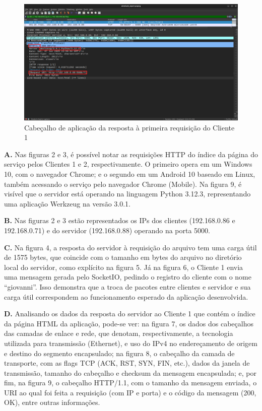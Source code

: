 \documentclass[conference,compsoc]{IEEEtran}
\begin{document}
\begin{otherlanguage}{brazil}
\begin{figure}[!h]
\centering
\includegraphics[width=\columnwidth]{../media/07-server_application.png}
\caption{Cabeçalho de aplicação da resposta à primeira requisição do Cliente 1}
\label{fig:application_header}
\end{figure}

\textbf{A.} Nas figuras 2 e 3, é possível notar as requisições HTTP do índice da página do serviço pelos Clientes 1 e 2, respectivamente. O primeiro opera em um Windows 10, com o navegador Chrome; e o segundo em um Android 10 baseado em Linux, também acessando o serviço pelo navegador Chrome (Mobile). Na figura 9, é visível que o servidor está operando na linguagem Python 3.12.3, representando uma aplicação Werkzeug na versão 3.0.1.

\textbf{B.} Nas figuras 2 e 3 estão representados os IPs dos clientes (192.168.0.86 e 192.168.0.71) e do servidor (192.168.0.88) operando na porta 5000.

\textbf{C.} Na figura 4, a resposta do servidor à requisição do arquivo tem uma carga útil de 1575 bytes, que coincide com o tamanho em bytes do arquivo no diretório local do servidor, como explícito na figura 5. Já na figura 6, o Cliente 1 envia uma mensagem gerada pelo SocketIO, pedindo o registro do cliente com o nome ``giovanni''. Isso demonstra que a troca de pacotes entre clientes e servidor e sua carga útil correspondem ao funcionamento esperado da aplicação desenvolvida.

\textbf{D.} Analisando os dados da resposta do servidor ao Cliente 1 que contém o índice da página HTML da aplicação, pode-se ver: na figura 7, os dados dos cabeçalhos das camadas de enlace e rede, que denotam, respectivamente, a tecnologia utilizada para transmissão (Ethernet), e uso do IPv4 no endereçamento de origem e destino do segmento encapsulado; na figura 8, o cabeçalho da camada de transporte, com as flags TCP (ACK, RST, SYN, FIN, etc.), dados da janela de transmissão, tamanho do cabeçalho e checksum da mensagem encapsulada; e, por fim, na figura 9, o cabeçalho HTTP/1.1, com o tamanho da mensagem enviada, o URI ao qual foi feita a requisição (com IP e porta) e o código da mensagem (200, OK), entre outras informações.



\end{otherlanguage}
\end{document}
